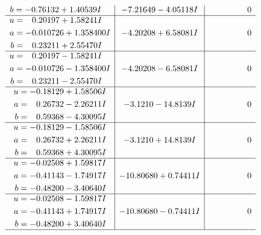 \documentclass[1p]{elsarticle_modified}
\theoremstyle{definition}
\begin{document}
$$\begin{array}{c|c|c}
\begin{aligned}
b &= -0.76132 + 1.40539 I\end{aligned}
 & -7.21649 - 4.05118 I & \phantom{-0.000000 } 0 \\ \hline\begin{aligned}
u &= \phantom{-}0.20197 + 1.58241 I \\
a &= -0.010726 + 1.358400 I \\
b &= \phantom{-}0.23211 + 2.55470 I\end{aligned}
 & -4.20208 + 6.58081 I & \phantom{-0.000000 } 0 \\ \hline\begin{aligned}
u &= \phantom{-}0.20197 - 1.58241 I \\
a &= -0.010726 - 1.358400 I \\
b &= \phantom{-}0.23211 - 2.55470 I\end{aligned}
 & -4.20208 - 6.58081 I & \phantom{-0.000000 } 0 \\ \hline\begin{aligned}
u &= -0.18129 + 1.58506 I \\
a &= \phantom{-}0.26732 - 2.26211 I \\
b &= \phantom{-}0.59368 - 4.30095 I\end{aligned}
 & -3.1210 - 14.8139 I & \phantom{-0.000000 } 0 \\ \hline\begin{aligned}
u &= -0.18129 - 1.58506 I \\
a &= \phantom{-}0.26732 + 2.26211 I \\
b &= \phantom{-}0.59368 + 4.30095 I\end{aligned}
 & -3.1210 + 14.8139 I & \phantom{-0.000000 } 0 \\ \hline\begin{aligned}
u &= -0.02508 + 1.59817 I \\
a &= -0.41143 - 1.74917 I \\
b &= -0.48200 - 3.40640 I\end{aligned}
 & -10.80680 + 0.74411 I & \phantom{-0.000000 } 0 \\ \hline\begin{aligned}
u &= -0.02508 - 1.59817 I \\
a &= -0.41143 + 1.74917 I \\
b &= -0.48200 + 3.40640 I\end{aligned}
 & -10.80680 - 0.74411 I & \phantom{-0.000000 } 0\\
 \hline 
 \end{array}$$\newpage$$\begin{array}{c|c|c}  

\end{array}$$
\end{document}
